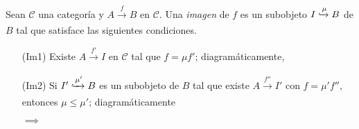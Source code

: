 \documentclass[tesis]{subfiles}
\begin{document}
\begin{Def}\label{Def: Imagen}
    Sean $\mathscr{C}$ una categoría y $A\xrightarrow[]{f}B$ en $\mathscr{C}$. Una \emph{imagen} de $f$ es un subobjeto $I\xhookrightarrow{\mu} B$ de $B$ tal que satisface las siguientes condiciones.

    \begin{itemize}
    
        \item[(Im1)] Existe $A\xrightarrow[]{f'}I$ en $\mathscr{C}$ tal que $f=\mu f'$; diagramáticamente,
            \begin{center}
            \end{center}

        \item[(Im2)] Si $I'\xhookrightarrow{\mu'} B$ es un subobjeto de $B$ tal que existe $A\xrightarrow[]{f''}I'$ con $f=\mu'f''$, entonces $\mu\le\mu'$; diagramáticamente
            \begin{center}
                \quad $\implies$ \quad
            \end{center}
    \end{itemize}
\end{Def}
\end{document}
